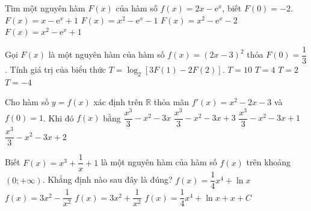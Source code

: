 \begin{ex}%
	Tìm một nguyên hàm $F(x)$ của  hàm số $f(x)=2x-\mathrm{e}^x$, biết $F(0)=-2$.
	\choice 
		 {$F(x)=x-\mathrm{e}^x+1$}
		{\True $F(x)=x^2-\mathrm{e}^x-1$} 
		 {$F(x)=x^2-\mathrm{e}^x-2$}
		{$F(x)=x^2-\mathrm{e}^x+1$} 
\end{ex}

\begin{ex}%
	Gọi $F(x)$ là một nguyên hàm của hàm số $f(x)=(2x-3)^2$ thỏa $F(0)=\dfrac{1}{3}$. Tính giá trị của biểu  thức $T=\log_2[3F(1)-2F(2)]$.
	 \choice
		{$T=10$} 
		{$T=4$} 
		 {\True $T=2$}
		{$T=-4$} 
\end{ex}

\begin{ex}%
	Cho hàm số $y=f(x)$ xác định trên $\mathbb{R}$ thỏa mãn $f'(x)=x^2-2x-3$ và $f(0)=1$. Khi đó $f(x)$  bằng
	\choice 
		{$\dfrac{x^3}{3}-x^2-3x$} 
		{$\dfrac{x^3}{3}-x^2-3x+3$} 
		{\True  $\dfrac{x^3}{3}-x^2-3x+1$}
		 {$\dfrac{x^3}{3}-x^2-3x+2$}
\end{ex}

\begin{ex}%
	Biết $F(x)=x^3+\dfrac{1}{x}+1$ là một nguyên hàm của hàm số $f(x)$ trên khoảng $(0;+\infty)$. Khẳng định  nào sau đây là đúng?
	\choice 
		 {$f(x)=\dfrac{1}{4}x^4+\ln x$}
		 {\True $f(x)=3x^2-\dfrac{1}{x^2}$}
		{$f(x)=3x^2+\dfrac{1}{x^2}$} 
		{$f(x)=\dfrac{1}{4}x^4+\ln  x+x+C$}
\end{ex}

